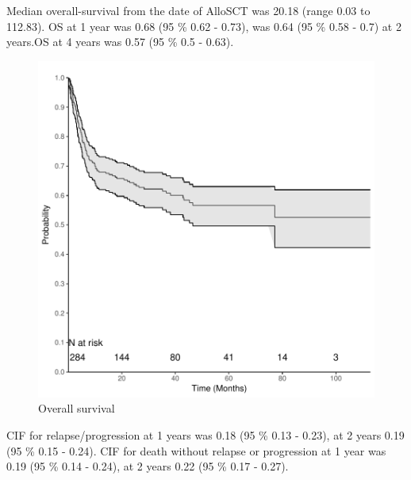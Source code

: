 \documentclass[a4paper,11pt] {article}
\begin{document}
Median overall-survival from the date of AlloSCT was 20.18 (range 0.03 to 112.83). OS at 1 year was 0.68 (95 \% 0.62 - 0.73), was 0.64 (95 \% 0.58 - 0.7) at 2 years.OS at 4 years was 0.57 (95 \% 0.5 - 0.63).
\begin{figure}[h]
\begin{center}
\includegraphics{Rapport-fig1}
\end{center}
\caption{Overall survival}
\label{fig1}
\end{figure}

\pagebreak
CIF for relapse/progression at 1 years was 0.18 (95 \% 0.13 - 0.23), at 2 years  0.19 (95 \% 0.15 - 0.24).
CIF for death without relapse or progression at 1 year was 0.19 (95 \% 0.14 - 0.24), at 2 years  0.22 (95 \% 0.17 - 0.27). 
\end{document}
